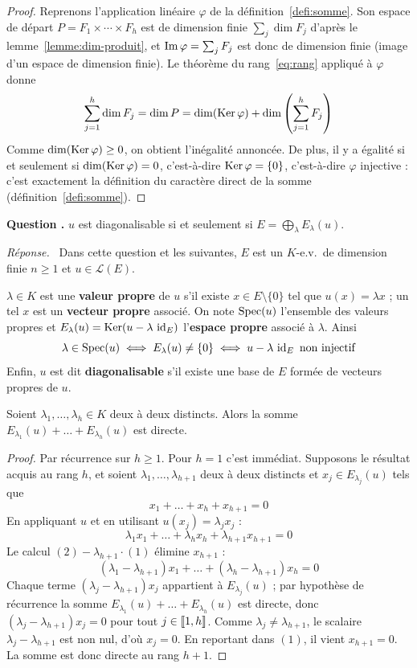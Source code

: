 \documentclass[11pt]{article}
\newcounter{qnum}
\newcommand{\question}[1]{%
\stepcounter{qnum}%
\bigskip
\noindent\textbf{Question \theqnum.} #1\par}
\newcommand{\reponse}{\noindent\textit{Réponse.}\ }
\begin{document}
\begin{proof}
Reprenons l'application linéaire $\varphi$ de la définition~\ref{defi:somme}. Son espace de départ $P=F_1\times\cdots\times F_h$ est de dimension finie $\sum_{j}\dim F_j$ d'après le lemme~\ref{lemme:dim-produit}, et $\operatorname{Im}\varphi=\sum_j F_j$ est donc de dimension finie (image d'un espace de dimension finie). Le théorème du rang~\eqref{eq:rang} appliqué à $\varphi$ donne
\[\sum_{j=1}^{h}\dim F_j = \dim P = \dim(\operatorname{Ker}\varphi)+\dim\left(\sum_{j=1}^{h}F_j\right)\]
Comme $\dim(\operatorname{Ker}\varphi)\geq 0$, on obtient l'inégalité annoncée. De plus, il y a égalité si et seulement si $\dim(\operatorname{Ker}\varphi)=0$, c'est-à-dire $\operatorname{Ker}\varphi=\{0\}$, c'est-à-dire $\varphi$ injective : c'est exactement la définition du caractère direct de la somme (définition~\ref{defi:somme}).
\end{proof}

\question{$u$ est diagonalisable si et seulement si $E=\bigoplus_{\lambda} E_\lambda(u)$.}
\reponse
Dans cette question et les suivantes, $E$ est un $K$-e.v.\ de dimension finie $n\geq 1$ et $u\in\mathcal{L}(E)$.

\begin{defi}
\label{defi:diago}
$\lambda\in K$ est une \textbf{valeur propre} de $u$ s'il existe $x\in E\setminus\{0\}$ tel que $u(x)=\lambda x$ ; un tel $x$ est un \textbf{vecteur propre} associé. On note $\operatorname{Spec}(u)$ l'ensemble des valeurs propres et $E_\lambda(u)=\operatorname{Ker}(u-\lambda\,\operatorname{id}_E)$ l'\textbf{espace propre} associé à $\lambda$. Ainsi
\[\lambda\in\operatorname{Spec}(u) \iff E_\lambda(u)\neq\{0\} \iff u-\lambda\,\operatorname{id}_E \text{ non injectif}\]
Enfin, $u$ est dit \textbf{diagonalisable} s'il existe une base de $E$ formée de vecteurs propres de $u$.
\end{defi}

\begin{lemme}
\label{lemme:somme-directe-propres}
Soient $\lambda_1,\dots,\lambda_h\in K$ deux à deux distincts. Alors la somme $E_{\lambda_1}(u)+\dots+E_{\lambda_h}(u)$ est directe.
\end{lemme}

\begin{proof}
Par récurrence sur $h\geq 1$. Pour $h=1$ c'est immédiat. Supposons le résultat acquis au rang $h$, et soient $\lambda_1,\dots,\lambda_{h+1}$ deux à deux distincts et $x_j\in E_{\lambda_j}(u)$ tels que
\[x_1+\dots+x_h+x_{h+1}=0 \tag{1}\]
En appliquant $u$ et en utilisant $u(x_j)=\lambda_j x_j$ :
\[\lambda_1x_1+\dots+\lambda_hx_h+\lambda_{h+1}x_{h+1}=0 \tag{2}\]
Le calcul $(2)-\lambda_{h+1}\cdot(1)$ élimine $x_{h+1}$ :
\[(\lambda_1-\lambda_{h+1})x_1+\dots+(\lambda_h-\lambda_{h+1})x_h=0\]
Chaque terme $(\lambda_j-\lambda_{h+1})x_j$ appartient à $E_{\lambda_j}(u)$ ; par hypothèse de récurrence la somme $E_{\lambda_1}(u)+\dots+E_{\lambda_h}(u)$ est directe, donc $(\lambda_j-\lambda_{h+1})x_j=0$ pour tout $j\in\llbracket 1,h \rrbracket$. Comme $\lambda_j\neq\lambda_{h+1}$, le scalaire $\lambda_j-\lambda_{h+1}$ est non nul, d'où $x_j=0$. En reportant dans $(1)$, il vient $x_{h+1}=0$. La somme est donc directe au rang $h+1$.
\end{proof}
\end{document}
